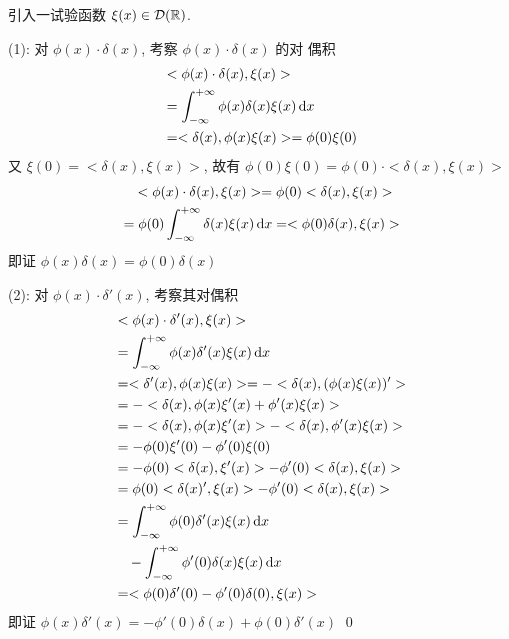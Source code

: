 \begin{solution}
引入一试验函数 $\xi(x) \in \mathcal D({\mathbb R})$.

\noindent (1): 对 $\phi(x) \cdot \delta(x)$, 考察 $\phi(x) \cdot \delta(x)$ 的对
偶积
\begin{align*}
&<\phi(x) \cdot \delta(x), \xi(x)> \\
&= \int_{-\infty}^{+\infty} 
    \phi(x) \delta(x) \xi(x) \operatorname{d\!} x \\
&= <\delta(x), \phi(x) \xi(x)> = \phi(0) \xi(0)
\end{align*}
又 $\xi(0) = <\delta(x), \xi(x)>$, 故有
$\phi(0)\xi(0) = \phi(0) \cdot <\delta(x), \xi(x)>$
\begin{align*}
&\quad <\phi(x) \cdot \delta(x), \xi(x)> = \phi(0) <\delta(x), \xi(x)> \\
&= \phi(0) \int_{-\infty}^{+\infty}\delta(x)\xi(x)\operatorname{d\!} x
    = <\phi(0) \delta(x), \xi(x)>
\end{align*}
即证 $\phi(x)\delta(x) = \phi(0)\delta(x)$

\noindent (2): 对 $\phi(x) \cdot \delta'(x)$, 考察其对偶积
\begin{align*}
&<\phi(x) \cdot \delta'(x), \xi(x)> \\
&= \int_{-\infty}^{+\infty} \phi(x) \delta'(x) \xi(x) \operatorname{d\!} x \\
&= <\delta'(x), \phi(x)\xi(x)> = -<\delta(x), (\phi(x)\xi(x))'> \\
&= -<\delta(x), \phi(x)\xi'(x) + \phi'(x)\xi(x)> \\
&= -<\delta(x), \phi(x)\xi'(x)> - <\delta(x), \phi'(x)\xi(x)> \\
&= -\phi(0)\xi'(0) - \phi'(0)\xi(0) \\
&= -\phi(0)<\delta(x), \xi'(x)> - \phi'(0)<\delta(x), \xi(x)> \\
&= \phi(0)<\delta(x)', \xi(x)> - \phi'(0)<\delta(x), \xi(x)> \\
&= \int_{-\infty}^{+\infty} \phi(0)\delta'(x)\xi(x) \operatorname{d\!} x \\
    &\quad- \int_{-\infty}^{+\infty} \phi'(0)\delta(x)\xi(x) \operatorname{d\!} x \\
&= <\phi(0)\delta'(0) - \phi'(0)\delta(0), \xi(x)>
\end{align*}
即证 $\phi(x)\delta'(x) = -\phi'(0)\delta(x) + \phi(0)\delta'(x)$
\qed
\end{solution}
